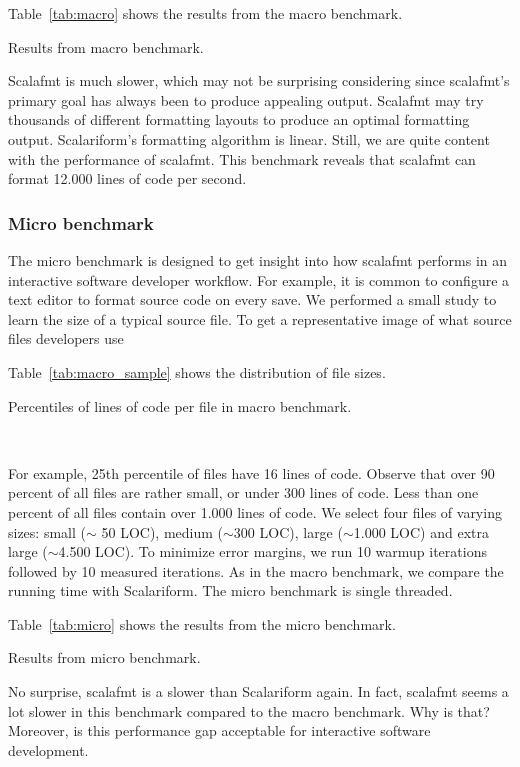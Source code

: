 Table~\ref{tab:macro} shows the results from the macro benchmark.
\begin{table}
  \centering
  \caption{Results from macro benchmark.}\label{tab:macro}
  
\end{table}
Scalafmt is much slower, which may not be surprising considering since scalafmt's primary goal has always been to produce appealing output.
Scalafmt may try thousands of different formatting layouts to produce an optimal formatting output.
Scalariform's formatting algorithm is linear.
Still, we are quite content with the performance of scalafmt.
This benchmark reveals that scalafmt can format 12.000 lines of code per second.


\subsubsection{Micro benchmark}
The micro benchmark is designed to get insight into how scalafmt performs in an interactive software developer workflow.
For example, it is common to configure a text editor to format source code on every save.
We performed a small study to learn the size of a typical source file.
To get a representative image of what source files developers use

Table~\ref{tab:macro_sample} shows the distribution of file sizes.
\begin{table}
  \centering
  \caption{Percentiles of lines of code per file in macro benchmark.}~\label{tab:macro_sample}
  
\end{table}
For example, 25th percentile of files have 16 lines of code.
Observe that over 90 percent of all files are rather small, or under 300 lines of code.
Less than one percent of all files contain over 1.000 lines of code.
We select four files of varying sizes: small ($\sim$ 50 LOC), medium ($\sim$300 LOC), large ($\sim$1.000 LOC) and extra large ($\sim$4.500 LOC).
To minimize error margins, we run 10 warmup iterations followed by 10 measured iterations.
As in the macro benchmark, we compare the running time with Scalariform.
The micro benchmark is single threaded.

Table~\ref{tab:micro} shows the results from the micro benchmark.
\begin{table}
  \centering
  \caption{Results from micro benchmark.}\label{tab:micro}
  
\end{table}
No surprise, scalafmt is a slower than Scalariform again.
In fact, scalafmt seems a lot slower in this benchmark compared to the macro benchmark.
Why is that?
Moreover, is this performance gap acceptable for interactive software development.

